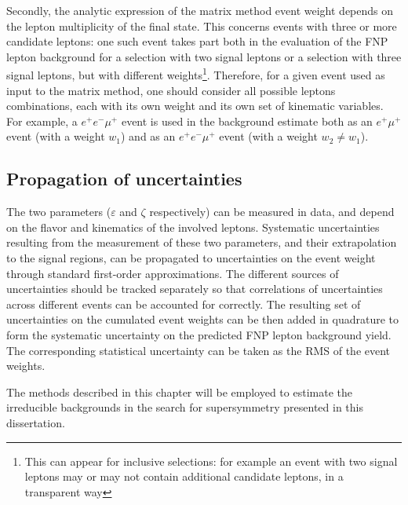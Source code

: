 Secondly, the analytic expression of the matrix method event weight depends on the lepton multiplicity of the final state. This concerns events with three or more candidate leptons: one such event takes part both in the evaluation of the FNP lepton background for a selection with two signal leptons or a selection with three signal leptons, but with different weights\footnote{This can appear for inclusive selections: for example an event with two signal leptons may or may not contain additional candidate leptons, in a transparent way}. Therefore, for a given event used as input to the matrix method, one should consider all possible leptons combinations, each with its own weight and its own set of kinematic variables. For example, a $e^+e^-\mu^+$ event is used in the background estimate both as an $e^+\mu^+$ event (with a weight $w_1$) and as an $e^+e^-\mu^+$ event (with a weight $w_2\neq w_1$).  

\subsection{Propagation of uncertainties}

The two parameters ($\varepsilon$ and $\zeta$ respectively) can be measured in data, and depend on the flavor and kinematics of the involved leptons.  Systematic uncertainties resulting from the measurement of these two parameters, and their extrapolation to the signal regions, can be propagated to uncertainties on the event weight through standard first-order approximations. The different sources of uncertainties should be tracked separately so that correlations of uncertainties across different events can be accounted for correctly. The resulting set of uncertainties on the cumulated event weights can be then added in quadrature to form the systematic uncertainty on the predicted FNP lepton background yield. The corresponding statistical uncertainty can be taken as the RMS of the event weights.


The methods described in this chapter will be employed to estimate the 
irreducible backgrounds in the search for supersymmetry presented in this 
dissertation.
